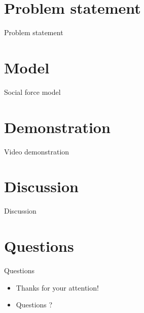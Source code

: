 \section{Problem statement}

\begin{frame}{Problem statement}
\end{frame}


\section{Model}

\begin{frame}{Social force model}
\end{frame}



\section{Demonstration}

\begin{frame}{Video demonstration}
\end{frame}


\section{Discussion}

\begin{frame}{Discussion}
\end{frame}


\section{Questions}

\begin{frame}{Questions}
	\begin{itemize}
		\item Thanks for your attention!
		\item Questions ?
	\end{itemize}
\end{frame}

